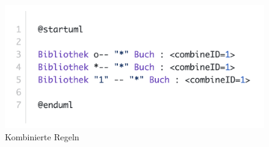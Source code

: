 \begin{figure}[h]
    \centering
    \includegraphics[width=16cm]{images/combined}
    \caption{Kombinierte Regeln}
    \label{fig:combined}
\end{figure}


